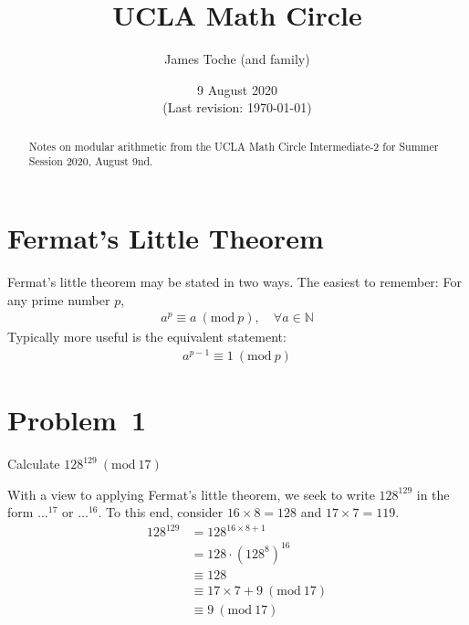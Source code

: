 \documentclass[12pt]{article}
\title{UCLA Math Circle}
\author{James Toche (and family)}
\date{9 August 2020 \\(Last revision: \today)}
\newcommand{\modulo}[1]{~(\mathrm{mod}~#1)}
\begin{document}
\begin{minipage}{\textwidth}
\maketitle
\begin{abstract}
Notes on modular arithmetic from the UCLA Math Circle Intermediate-2 for Summer Session 2020, August 9nd. 
\end{abstract}
\end{minipage}

\section*{Fermat's Little Theorem}
Fermat's little theorem may be stated in two ways. The easiest to remember: For any prime number $p$,
\begin{align*}
a^{p} \equiv a \modulo{p}, \quad \forall a\in\mathbb{N}
\end{align*}
Typically more useful is the equivalent statement:
\begin{align*}
a^{p-1} \equiv 1 \modulo{p}
\end{align*}


\section*{Problem~1}
\begin{question}
Calculate $128^{129}\modulo{17}$
\end{question}

With a view to applying Fermat's little theorem, we seek to write $128^{129}$ in the form $\ldots^{17}$ or $\ldots^{16}$. To this end, consider $16\times8=128$ and $17\times7=119$. 
\begin{align*}
128^{129} 
 & = 128^{16\times8+1} \\
 & = 128 \cdot (128^{8})^{16} \\
 & \equiv 128 \\
 & \equiv 17 \times 7 + 9 \modulo{17} \\
 & \equiv 9 \modulo{17}
\end{align*}


\clearpage
\end{document}
